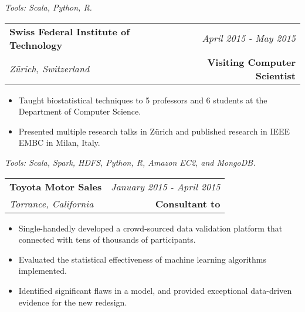 \documentclass[10pt,a4paper]{article}
\begin{document}
  \vspace*{2mm}\setlength\parindent{2mm}\begin{minipage}{16.8cm}
    \textit{Tools: Scala, Python, R.}
  \end{minipage}


  \vspace*{3mm}\noindent\begin{tabularx}{17cm}{X r}
    \textbf{Swiss Federal Institute of Technology} & \textit{April 2015 - May 2015} \\
    \textit{Z{\"u}rich, Switzerland} & \textbf{Visiting Computer Scientist} \\
  \end{tabularx}

  \vspace*{1mm}\noindent\begin{minipage}{17cm}
    \begin{itemize}[leftmargin=6mm,topsep=0mm,itemsep=-1mm]
      \item Taught biostatistical techniques to 5 professors and 6 students at the Department of Computer Science. 
      \item Presented multiple research talks in Z{\"u}rich and published research in IEEE EMBC in Milan, Italy.
    \end{itemize}
  \end{minipage}

  \vspace*{2mm}\setlength\parindent{2mm}\begin{minipage}{16.8cm}
    \textit{Tools: Scala, Spark, HDFS, Python, R, Amazon EC2, and MongoDB.}
  \end{minipage}

  \vspace*{3mm}\noindent\begin{tabularx}{17cm}{X r}
    \textbf{Toyota Motor Sales} & \textit{January 2015 - April 2015} \\
    \textit{Torrance, California} & \textbf{Consultant to} \\
  \end{tabularx}

  \vspace*{1mm}\noindent\begin{minipage}{17cm}
    \begin{itemize}[leftmargin=6mm,topsep=0mm,itemsep=-1mm]
      \item Single-handedly developed a crowd-sourced data validation platform that connected with tens of thousands of participants. 
      \item Evaluated the statistical effectiveness of machine learning algorithms implemented.
      \item Identified significant flaws in a model, and provided exceptional data-driven evidence for the new redesign.
    \end{itemize}
  \end{minipage}
\end{document}
